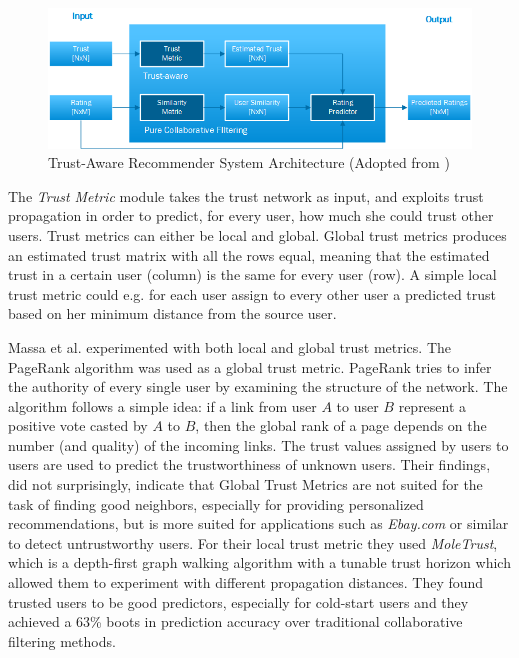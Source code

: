 \begin{figure}[H]
    \includegraphics[width=5in]{image/trustawarearchitecture.png}
    \centering
    \caption[Trust-Aware Recommender System Architecture]{Trust-Aware
    Recommender System Architecture (Adopted from \cite{Massa2004})}
    \label{figure:trustarchictecture}
\end{figure}

The \emph{Trust Metric} module takes the trust network as input, and exploits
trust propagation in order to predict, for every user, how much she could trust
other users. Trust metrics can either be local and global. Global trust metrics
produces an estimated trust matrix with all the rows equal, meaning that the
estimated trust in a certain user (column) is the same for every user (row). A
simple local trust metric could e.g. for each user assign to every other user a
predicted trust based on her minimum distance from the source user. 

Massa et al. \cite{Massa2007} experimented with both local and global trust
metrics. The PageRank algorithm was used as a global trust metric. PageRank
tries to infer the authority of every single user by examining the structure of
the network. The algorithm follows a simple idea: if a link from user $A$ to
user $B$ represent a positive vote casted by $A$ to $B$, then the global rank
of a page depends on the number (and quality) of the incoming links. The trust
values assigned by users to users are used to predict the trustworthiness of
unknown users. Their findings, did not surprisingly, indicate that Global Trust
Metrics are not suited for the task of finding good neighbors, especially for
providing personalized recommendations, but is more suited for applications such
as \emph{Ebay.com} or similar to detect untrustworthy users. For their local trust metric
they used \emph{MoleTrust}, which is a depth-first graph walking algorithm with a tunable
trust horizon which allowed them to experiment with different propagation
distances. They found trusted users to be good predictors, especially for cold-start
users and they achieved a 63\% boots in prediction accuracy over traditional collaborative filtering
methods.

